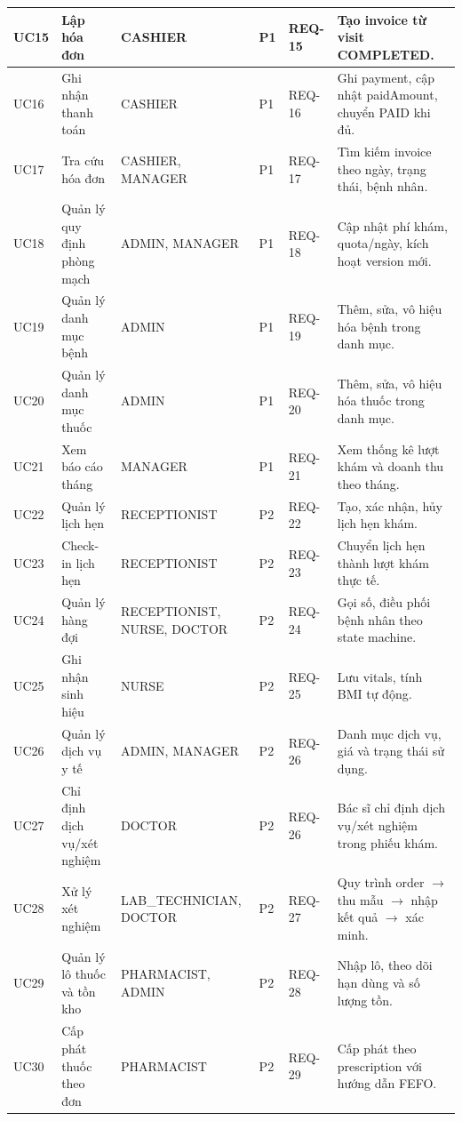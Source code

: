 \begin{longtable}{|p{1.3cm}|p{3.5cm}|p{2.5cm}|p{1.2cm}|p{1.2cm}|p{4.0cm}|}
\hline
UC15 & Lập hóa đơn & CASHIER & P1 & REQ-15 & Tạo invoice từ visit COMPLETED. \\
\hline
UC16 & Ghi nhận thanh toán & CASHIER & P1 & REQ-16 & Ghi payment, cập nhật paidAmount, chuyển PAID khi đủ. \\
\hline
UC17 & Tra cứu hóa đơn & CASHIER, MANAGER & P1 & REQ-17 & Tìm kiếm invoice theo ngày, trạng thái, bệnh nhân. \\
\hline
UC18 & Quản lý quy định phòng mạch & ADMIN, MANAGER & P1 & REQ-18 & Cập nhật phí khám, quota/ngày, kích hoạt version mới. \\
\hline
UC19 & Quản lý danh mục bệnh & ADMIN & P1 & REQ-19 & Thêm, sửa, vô hiệu hóa bệnh trong danh mục. \\
\hline
UC20 & Quản lý danh mục thuốc & ADMIN & P1 & REQ-20 & Thêm, sửa, vô hiệu hóa thuốc trong danh mục. \\
\hline
UC21 & Xem báo cáo tháng & MANAGER & P1 & REQ-21 & Xem thống kê lượt khám và doanh thu theo tháng. \\
\hline
UC22 & Quản lý lịch hẹn & RECEPTIONIST & P2 & REQ-22 & Tạo, xác nhận, hủy lịch hẹn khám. \\
\hline
UC23 & Check-in lịch hẹn & RECEPTIONIST & P2 & REQ-23 & Chuyển lịch hẹn thành lượt khám thực tế. \\
\hline
UC24 & Quản lý hàng đợi & RECEPTIONIST, NURSE, DOCTOR & P2 & REQ-24 & Gọi số, điều phối bệnh nhân theo state machine. \\
\hline
UC25 & Ghi nhận sinh hiệu & NURSE & P2 & REQ-25 & Lưu vitals, tính BMI tự động. \\
\hline
UC26 & Quản lý dịch vụ y tế & ADMIN, MANAGER & P2 & REQ-26 & Danh mục dịch vụ, giá và trạng thái sử dụng. \\
\hline
UC27 & Chỉ định dịch vụ/xét nghiệm & DOCTOR & P2 & REQ-26 & Bác sĩ chỉ định dịch vụ/xét nghiệm trong phiếu khám. \\
\hline
UC28 & Xử lý xét nghiệm & LAB\_TECHNICIAN, DOCTOR & P2 & REQ-27 & Quy trình order $\rightarrow$ thu mẫu $\rightarrow$ nhập kết quả $\rightarrow$ xác minh. \\
\hline
UC29 & Quản lý lô thuốc và tồn kho & PHARMACIST, ADMIN & P2 & REQ-28 & Nhập lô, theo dõi hạn dùng và số lượng tồn. \\
\hline
UC30 & Cấp phát thuốc theo đơn & PHARMACIST & P2 & REQ-29 & Cấp phát theo prescription với hướng dẫn FEFO. \\
\hline
\end{longtable}

